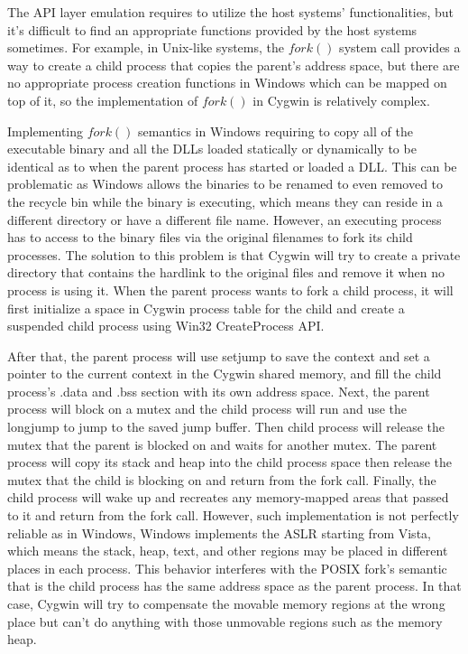 The API layer emulation requires to utilize the host systems' functionalities, but it's difficult to find an appropriate functions provided by the host systems sometimes. For example, in Unix-like systems, the $fork()$ system call provides a way to create a child process that copies the parent's address space, but there are no appropriate process creation functions in Windows which can be mapped on top of it, so the implementation of $fork()$ in Cygwin is relatively complex.  

Implementing $fork()$ semantics in Windows requiring to copy all of the executable binary and all the DLLs loaded statically or dynamically to be identical as to when the parent process has started or loaded a DLL. This can be problematic as Windows allows the binaries to be renamed to even removed to the recycle bin while the binary is executing, which means they can reside in a different directory or have a different file name. However, an executing process has to access to the binary files via the original filenames to fork its child processes. The solution to this problem is that Cygwin will try to create a private directory that contains the hardlink to the original files and remove it when no process is using it. When the parent process wants to fork a child process, it will first initialize a space in Cygwin process table for the child and create a suspended child process using Win32 CreateProcess API. 

After that, the parent process will use setjump to save the context and set a pointer to the current context in the Cygwin shared memory, and fill the child process's .data and .bss section with its own address space. Next, the parent process will block on a mutex and the child process will run and use the longjump to jump to the saved jump buffer. Then child process will release the mutex that the parent is blocked on and waits for another mutex. The parent process will copy its stack and heap into the child process space then release the mutex that the child is blocking on and return from the fork call. Finally, the child process will wake up and recreates any memory-mapped areas that passed to it and return from the fork call. However, such implementation is not perfectly reliable as in Windows, Windows implements the ASLR starting from Vista, which means the stack, heap, text, and other regions may be placed in different places in each process. This behavior interferes with the POSIX fork's semantic that is the child process has the same address space as the parent process. In that case, Cygwin will try to compensate the movable memory regions at the wrong place but can't do anything with those unmovable regions such as the memory heap.

